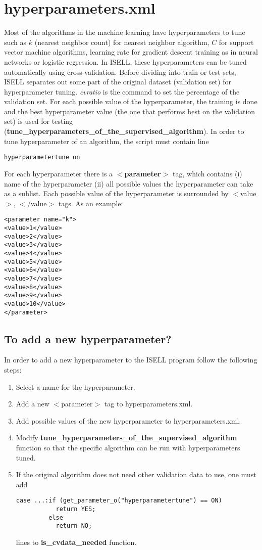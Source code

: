 \documentclass[a4paper,12pt]{book}
\begin{document}
\section{hyperparameters.xml}
Most of the algorithms in the machine learning have hyperparameters to tune such as $k$ (nearest neighbor count) for nearest neighbor algorithm, $C$ for support vector machine algorithms, learning rate for gradient descent training as in neural networks or logistic regression. In ISELL, these hyperparameters can be tuned automatically using cross-validation. Before dividing into train or test sets, ISELL separates out some part of the original dataset (validation set) for hyperparameter tuning. {\em cvratio} is the command to set the percentage of the validation set. For each possible value of the hyperparameter, the training is done and the best hyperparameter value (the one that performs best on the validation set) is used for testing ({\bf tune\_hyperparameters\_of\_the\_supervised\_algorithm}). In order to tune hyperparameter of an algorithm, the script must contain line
\begin{verbatim}
hyperparametertune on
\end{verbatim}

For each hyperparameter there is a {\bf $<$parameter$>$} tag, which contains (i) name of the hyperparameter (ii) all possible values the hyperparameter can take as a sublist. Each possible value of the hyperparameter is surrounded by $<$value$>$, $<$/value$>$ tags. As an example:
\begin{verbatim}
<parameter name="k">
<value>1</value>
<value>2</value>
<value>3</value>
<value>4</value>
<value>5</value>
<value>6</value>
<value>7</value>
<value>8</value>
<value>9</value>
<value>10</value>
</parameter>
\end{verbatim}

\subsection{To add a new hyperparameter?}
In order to add a new hyperparameter to the ISELL program follow the following steps:
\begin{enumerate}
\item Select a name for the hyperparameter.
\item Add a new $<$parameter$>$ tag to hyperparameters.xml.
\item Add possible values of the new hyperparameter to hyperparameters.xml.
\item Modify {\bf tune\_hyperparameters\_of\_the\_supervised\_algorithm} function so that the specific algorithm can be run with hyperparameters tuned.
\item If the original algorithm does not need other validation data to use, one must add 
\begin{verbatim}
case ...:if (get_parameter_o("hyperparametertune") == ON)
           return YES;
         else 
           return NO;
\end{verbatim}
lines to {\bf is\_cvdata\_needed} function.
\end{enumerate}
\end{document}
